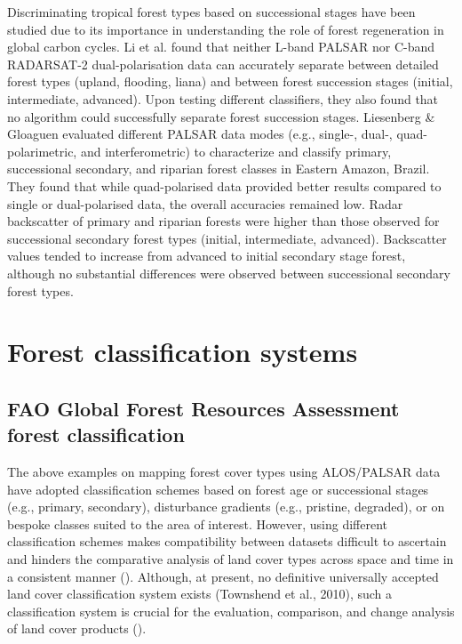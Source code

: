Discriminating tropical forest types based on successional stages have been studied due to its importance in understanding the role of forest regeneration in global carbon cycles. Li et al. \citeyearpar{li_comparative_2012} found that neither L-band PALSAR nor C-band RADARSAT-2 dual-polarisation data can accurately separate between detailed forest types (upland, flooding, liana) and between forest succession stages (initial, intermediate, advanced). Upon testing different classifiers, they also found that no algorithm could successfully separate forest succession stages. Liesenberg \& Gloaguen \citeyearpar{liesenberg_evaluating_2013} evaluated different PALSAR data modes (e.g., single-, dual-, quad-polarimetric, and interferometric) to characterize and classify primary, successional secondary, and riparian forest classes in Eastern Amazon, Brazil. They found that while quad-polarised data provided better results compared to single or dual-polarised data, the overall accuracies remained low. Radar backscatter of primary and riparian forests were higher than those observed for successional secondary forest types (initial, intermediate, advanced). Backscatter values tended to increase from advanced to initial secondary stage forest, although no substantial differences were observed between successional secondary forest types.

\section{Forest classification systems}
\label{sec: litrev-forest-class-system}

\subsection{FAO Global Forest Resources Assessment forest classification}

The above examples on mapping forest cover types using ALOS/PALSAR data have adopted classification schemes based on forest age or successional stages (e.g., primary, secondary), disturbance gradients (e.g., pristine, degraded), or on bespoke classes suited to the area of interest. However, using different classification schemes makes compatibility between datasets difficult to ascertain and hinders the comparative analysis of land cover types across space and time in a consistent manner (\cite{ahlqvist_search_2008}). Although, at present, no definitive universally accepted land cover classification system exists (Townshend et al., 2010), such a classification system is crucial for the evaluation, comparison, and change analysis of land cover products (\cite{giri_brief_2012}).

